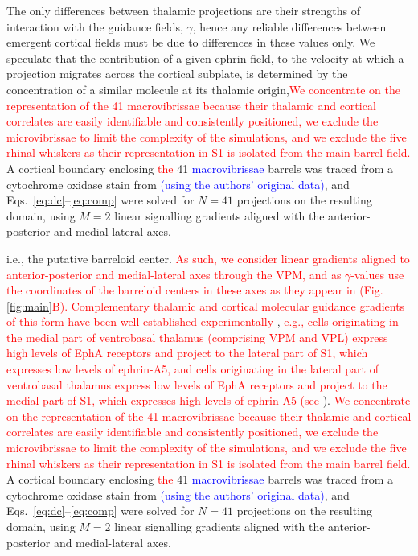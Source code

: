 \documentclass[9pt,lineno,draft]{elife}
\newcommand{\cmnt}[1]{\textcolor{blue}{#1}}
\newcommand{\stu}[1]{\textcolor{red}{#1}}
\begin{document}
The only differences between thalamic projections are their strengths of
interaction with the guidance fields, $\gamma$, hence any reliable differences
between emergent cortical fields must be due to differences in these values
only. We speculate that the contribution of a given ephrin field, to the
velocity at which a projection migrates across the cortical subplate, is
determined by the concentration of a similar molecule at its thalamic origin,\stu{We concentrate on the representation of the 41 macrovibrissae because their thalamic and cortical correlates are easily identifiable and consistently positioned, we exclude the microvibrissae to limit the complexity of the simulations, and we exclude the five rhinal whiskers as their representation in S1 is isolated from the main barrel field.} A cortical boundary enclosing \stu{the} 41 \cmnt{macrovibrissae} barrels was traced from
a cytochrome oxidase stain from \cite{zheng_signal_2001} \cmnt{(using the
  authors' original data)}, and Eqs.~\ref{eq:dc}--\ref{eq:comp} were solved
for $N=41$ projections on the resulting domain, using $M=2$ linear signalling
gradients aligned with the anterior-posterior and medial-lateral axes. 

i.e., the putative barreloid center. \stu{As such, we consider linear gradients aligned to anterior-posterior and medial-lateral axes through the VPM, and as $\gamma$-values use the coordinates of the barreloid centers in these axes as they appear in \citep{haidarliu_size_2001} (Fig.\,\ref{fig:main}B).} \stu{Complementary thalamic and cortical molecular guidance gradients of this form have been well established experimentally} \citep{vanderhaeghen_mapping_2000,miller_epha7-ephrin-a5_2006}, \stu{e.g., cells originating in the medial part of ventrobasal thalamus (comprising VPM and VPL) express high levels of EphA receptors and project to the lateral part of S1, which expresses low levels of ephrin-A5, and cells originating in the lateral part of ventrobasal thalamus express low levels of EphA receptors and project to the medial part of S1, which expresses high levels of ephrin-A5 (see} \citealp{gao_regulation_1998,dufour_area_2003,vanderhaeghen_developmental_2004,speer_grading_2005}). \stu{We concentrate on the representation of the 41 macrovibrissae because their thalamic and cortical correlates are easily identifiable and consistently positioned, we exclude the microvibrissae to limit the complexity of the simulations, and we exclude the five rhinal whiskers as their representation in S1 is isolated from the main barrel field.} A cortical boundary enclosing \stu{the} 41 \cmnt{macrovibrissae} barrels was traced from
a cytochrome oxidase stain from \cite{zheng_signal_2001} \cmnt{(using the
  authors' original data)}, and Eqs.~\ref{eq:dc}--\ref{eq:comp} were solved
for $N=41$ projections on the resulting domain, using $M=2$ linear signalling
gradients aligned with the anterior-posterior and medial-lateral axes. 
\end{document}
